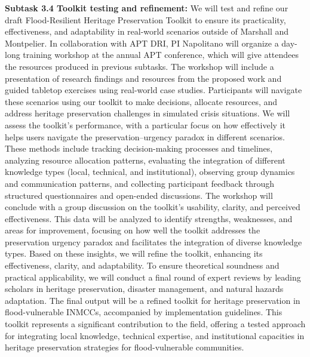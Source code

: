 \documentclass[11pt]{article}
\begin{document}
\textbf{Subtask 3.4 Toolkit testing and refinement:}
We will test and refine our draft Flood-Resilient Heritage Preservation Toolkit to ensure its practicality, effectiveness, and adaptability in real-world scenarios outside of Marshall and Montpelier. 
In collaboration with APT DRI, PI Napolitano will organize a day-long training workshop at the annual APT conference, which will give attendees the resources produced in previous subtasks. 
The workshop will include a presentation of research findings and resources from the proposed work and guided tabletop exercises using real-world case studies. 
Participants will navigate these scenarios using our toolkit to make decisions, allocate resources, and address heritage preservation challenges in simulated crisis situations. 
We will assess the toolkit’s performance, with a particular focus on how effectively it helps users navigate the preservation–urgency paradox in different scenarios. 
These methods include tracking decision-making processes and timelines, analyzing resource allocation patterns, evaluating the integration of different knowledge types (local, technical, and institutional), observing group dynamics and communication patterns, and collecting participant feedback through structured questionnaires and open-ended discussions. 
The workshop will conclude with a group discussion on the toolkit’s usability, clarity, and perceived effectiveness. 
This data will be analyzed to identify strengths, weaknesses, and areas for improvement, focusing on how well the toolkit addresses the preservation urgency paradox and facilitates the integration of diverse knowledge types. 
Based on these insights, we will refine the toolkit, enhancing its effectiveness, clarity, and adaptability. 
To ensure theoretical soundness and practical applicability, we will conduct a final round of expert reviews by leading scholars in heritage preservation, disaster management, and natural hazards adaptation. 
The final output will be a refined toolkit for heritage preservation in flood-vulnerable INMCCs, accompanied by implementation guidelines. 
This toolkit represents a significant contribution to the field, offering a tested approach for integrating local knowledge, technical expertise, and institutional capacities in heritage preservation strategies for flood-vulnerable communities.
\end{document}
